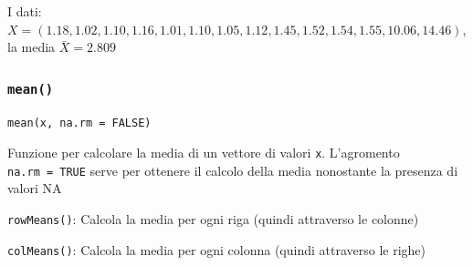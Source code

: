 \documentclass[
  a4paper,
  DIV=11,
  numbers=noendperiod]{scrreprt}
\begin{document}
\begin{center}
\end{center}

I dati:
\(X = (1.18,1.02,1.10,1.16,1.01,1.10,1.05,1.12,1.45,1.52,1.54,1.55,10.06,14.46)\),
la media \(\bar{X} = 2.809\)

\subsubsection{\texorpdfstring{\texttt{mean()}}{mean()}}\label{mean}

\begin{verbatim}
mean(x, na.rm = FALSE)
\end{verbatim}

Funzione per calcolare la media di un vettore di valori \texttt{x}.
L'agromento \texttt{na.rm\ =\ TRUE} serve per ottenere il calcolo della
media nonostante la presenza di valori NA

\texttt{rowMeans()}: Calcola la media per ogni riga (quindi attraverso
le colonne)

\texttt{colMeans()}: Calcola la media per ogni colonna (quindi
attraverso le righe)
\end{document}
